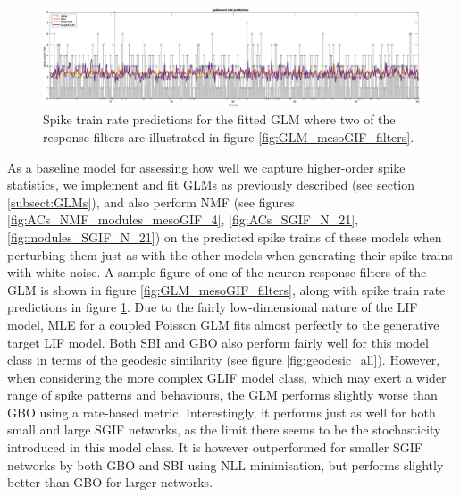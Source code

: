 \documentclass[mphil,deptreport,ianc]{infthesis} %
\begin{document}
\begin{figure}
    \centering
    \vspace{-0.1in}
    \includegraphics[width=1.7\columnwidth, angle=270]{figures/matlab/font_fix/export_GLM_filters_pred_bin_size_0_1_cell_2_target_GT_model_mesoGIF_N_4_3.png}
    \vspace{-0.1in}
    \caption{Spike train rate predictions for the fitted GLM where two of the response filters are illustrated in figure \ref{fig:GLM_mesoGIF_filters}.}
    \label{fig:GLM_mesoGIF_rate_preds}
\end{figure}

As a baseline model for assessing how well we capture higher-order spike statistics, we implement and fit GLMs as previously described (see section \ref{subsect:GLMs}), and also perform NMF (see figures \ref{fig:ACs_NMF_modules_mesoGIF_4}, \ref{fig:ACs_SGIF_N_21}, \ref{fig:modules_SGIF_N_21}) on the predicted spike trains of these models when perturbing them just as with the other models when generating their spike trains with white noise.
A sample figure of one of the neuron response filters of the GLM is shown in figure \ref{fig:GLM_mesoGIF_filters}, along with spike train rate predictions in figure \ref{fig:GLM_mesoGIF_rate_preds}.
Due to the fairly low-dimensional nature of the LIF model, MLE for a coupled Poisson GLM fits almost perfectly to the generative target LIF model.
Both SBI and GBO also perform fairly well for this model class in terms of the geodesic similarity (see figure \ref{fig:geodesic_all}).
However, when considering the more complex GLIF model class, which may exert a wider range of spike patterns and behaviours, the GLM performs slightly worse than GBO using a rate-based metric.
Interestingly, it performs just as well for both small and large SGIF networks, as the limit there seems to be the stochasticity introduced in this model class.
It is however outperformed for smaller SGIF networks by both GBO and SBI using NLL minimisation, but performs slightly better than GBO for larger networks.
\end{document}
